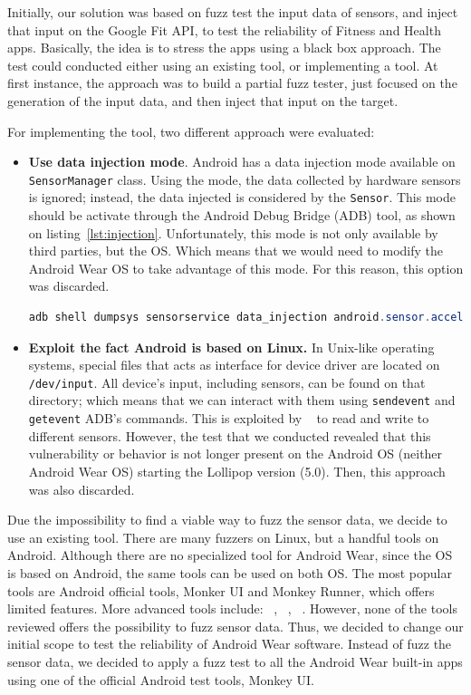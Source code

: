 \documentclass[11pt, draftclsnofoot, onecolumn]{IEEEtran}
\begin{document}
   Initially, our solution was based on fuzz test the input data of sensors, and inject that input on the Google Fit API, to test the reliability of Fitness and Health apps. Basically, the idea is to stress the apps using a black box approach. The test could conducted either using an existing tool, or implementing a tool. At first instance, the approach was to build a partial fuzz tester, just focused on the generation of the input data, and then inject that input on the target.
   
   For implementing the tool, two different approach were evaluated:
   
   \begin{itemize}
   \item \textbf{Use data injection mode}. Android has a data injection mode available on \texttt{SensorManager} class. Using the mode, the data collected by hardware sensors is ignored; instead, the data injected is considered by the \texttt{Sensor}. This mode should be activate through the Android Debug Bridge (ADB) tool, as shown on listing~\ref{lst:injection}. Unfortunately, this mode is not only available by third parties, but the OS.  Which means that we would need to modify the Android Wear OS to take advantage of this mode. For this reason, this option was discarded.
   
   \begin{lstlisting}[captionpos=b, caption={Enabling injection mode.}, label={lst:injection}, language=Java]
adb shell dumpsys sensorservice data_injection android.sensor.accelerometer
	\end{lstlisting}
    
   \item \textbf{Exploit the fact Android is based on Linux.} In Unix-like operating systems, special files that acts as interface for device driver are located on \texttt{/dev/input}. All device's input, including sensors, can be found on that directory; which means that we can interact with them using \texttt{sendevent} and \texttt{getevent} ADB's commands. This is exploited by  ~\cite{mohamed2016smashed} to read and write to different sensors. However, the test that we conducted revealed that this vulnerability or behavior is not longer present on the Android OS (neither Android Wear OS) starting the Lollipop version (5.0). Then, this approach was also discarded.
	\end{itemize}  

	Due the impossibility to find a viable way to fuzz the sensor data, we decide to use an existing tool. There are many fuzzers on Linux, but a handful tools on Android. Although there are no specialized tool for Android Wear, since the OS is based on Android, the same tools can be used on both OS. The most popular tools are Android official tools, Monker UI and Monkey Runner, which offers limited features. More advanced tools include: ~\cite{Cui2015}, ~\cite{Machiry2013}, ~\cite{Ye2013}. However, none of the tools reviewed offers the possibility to fuzz sensor data. Thus, we decided to change our initial scope to test the reliability of Android Wear software. Instead of fuzz the sensor data, we decided to apply a fuzz test to all the Android Wear built-in apps using one of the official Android test tools, Monkey UI. 
   
\end{document}
